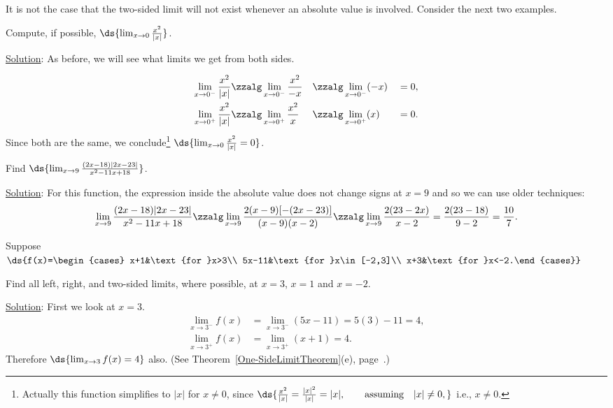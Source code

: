 It is not the case that the two-sided limit will not
exist whenever an absolute value is involved.
Consider the next two examples.

\bex Compute, if possible, $\ds{\lim_{x\to0}\frac{x^2}{|x|}}$.

\underline{Solution}: As before, we will see what limits
we get from both sides.

\begin{alignat*}{3}
\lim_{x\to0^-}\frac{x^2}{|x|}
&\zzalg\lim_{x\to0^-}\frac{x^2}{-x}
&&\zzalg\lim_{x\to0^-}(-x)&&=0,\\
\lim_{x\to0^+}\frac{x^2}{|x|}
&\zzalg\lim_{x\to0^+}\frac{x^2}{x}
&&\zzalg\lim_{x\to0^+}(x)&&=0.
\end{alignat*}
Since both are the same, we conclude\footnote{%
Actually this function simplifies to $|x|$ for $x\ne0$, since
$\ds{\frac{x^2}{|x|}=\frac{|x|^2}{|x|}=|x|,\qquad \text{assuming} \quad
|x|\ne0,}$
i.e., $x\ne0$.
} 
$\ds{\lim_{x\to0}\frac{x^2}{|x|}=0}$.
\eex

\bex Find $\ds{\lim_{x\to9}\frac{(2x-18)|2x-23|}{x^2-11x+18}}$.

\underline{Solution}: For this function, the expression
inside the absolute value does not change signs at $x=9$
and so we can use older techniques:
$$\lim_{x\to9}\frac{(2x-18)|2x-23|}{x^2-11x+18}
\zzalg\lim_{x\to9}\frac{2(x-9)[-(2x-23)]}%
{(x-9)(x-2)}\zzalg
\lim_{x\to9}\frac{2(23-2x)}{x-2}=\frac{2(23-18)}{9-2}=\frac{10}7.$$
\eex

\bex Suppose $\ds{f(x)=\begin{cases}
      x+1&\text{for }x>3\\
      5x-11&\text{for }x\in[-2,3]\\
      x+3&\text{for }x<-2.\end{cases}}$

\noindent Find all left, right, and two-sided limits, where possible,
at $x=3$, $x=1$ and $x=-2$.

\underline{Solution}:
First we look at $x=3$.
\begin{align*}
\lim_{x\to3^-}f(x)&=\lim_{x\to3^-}(5x-11)=5(3)-11=4,\\
\lim_{x\to3^+}f(x)&=\lim_{x\to3^+}(x+1)=4.
\end{align*}
Therefore $\ds{\lim_{x\to3}f(x)=4}$ also.  (See 
Theorem~\ref{One-SideLimitTheorem}(e), page~\pageref{One-SideLimitTheorem}.)

